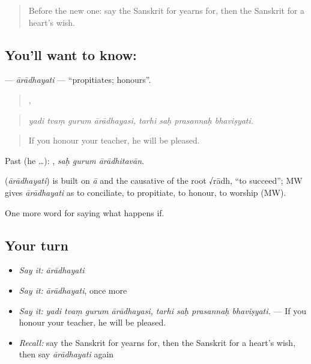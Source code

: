 \label{lesson:SA-C531-aradhayati}



\begin{quote}
Before the new one: say the Sanskrit for yearns for, then the Sanskrit for a heart's wish.
\end{quote}

\subsection*{You'll want to know: }
\textbf{} — \emph{ārādhayati} — \textquotedblleft{}propitiates; honours\textquotedblright{}.

\begin{quote}
   ,    
\end{quote}

\begin{quote}
\emph{yadi tvaṃ gurum ārādhayasi, tarhi saḥ prasannaḥ bhaviṣyati.}
\end{quote}

\begin{quote}
If you honour your teacher, he will be pleased.
\end{quote}

Past (he …):   , \emph{saḥ gurum ārādhitavān}.

\begin{cousinweb}
\textbf{} (\emph{ārādhayati}) is built on \emph{ā} and the causative of the root √rādh, \textquotedblleft{}to succeed\textquotedblright{}; MW gives \emph{ārādhayati} as to conciliate, to propitiate, to honour, to worship (MW).
\end{cousinweb}

\begin{grammarlens}[title={What you've built}]
One more word for saying what happens if.
\end{grammarlens}

\subsection*{Your turn}
\begin{itemize}
\raggedright
  \item \emph{Say it:} \emph{ārādhayati}
  \item \emph{Say it:} \emph{ārādhayati}, once more
  \item \emph{Say it:} \emph{yadi tvaṃ gurum ārādhayasi, tarhi saḥ prasannaḥ bhaviṣyati.} — If you honour your teacher, he will be pleased.
  \item \emph{Recall:} say the Sanskrit for yearns for, then the Sanskrit for a heart's wish, then say \emph{ārādhayati} again
\end{itemize}

